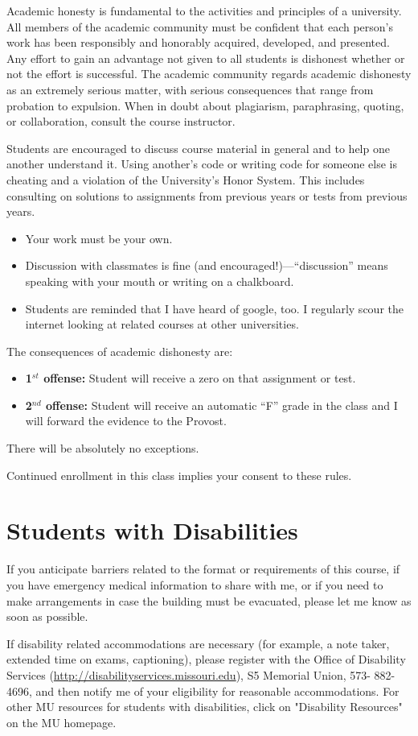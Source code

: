 \documentclass[11pt]{article}
\begin{document}
Academic honesty is fundamental to the activities and principles of a university. All members of the academic community must be confident that each person's work has been responsibly and honorably acquired, developed, and presented. Any effort to gain an advantage not given to all students is dishonest whether or not the effort is successful. The academic community regards academic dishonesty as an extremely serious matter, with serious consequences that range from probation to expulsion. When in doubt about plagiarism, paraphrasing, quoting, or collaboration, consult the course instructor. 
	
	Students are encouraged to discuss course material in general and to help one another understand it. Using another's code or writing code for someone else is cheating and a violation of the University's Honor System. This includes consulting on solutions to assignments from previous years or tests from previous years. 
\begin{itemize}
\item Your work must be your own. 
\item Discussion with classmates is fine (and encouraged!)---``discussion'' means speaking with your mouth or writing on a chalkboard.
\item Students are reminded that I have heard of google, too. I regularly scour the internet looking at related courses at other universities.
\end{itemize}

The consequences of academic dishonesty are:
\begin{itemize}
\item[] {\bf 1$^{st}$ offense:} Student will receive a zero on that assignment or test.
\item[] {\bf 2$^{nd}$ offense:} Student will receive an automatic “F” grade in the class and I will forward the evidence to the Provost.
\end{itemize}
There will be absolutely no exceptions.

Continued enrollment in this class implies your consent to these rules.


\section{Students with Disabilities}

If you anticipate barriers related to the format or requirements of this course, if you have emergency medical information to share with me, or if you need to make arrangements in case the building must be evacuated, please let me know as soon as possible.

If disability related accommodations are necessary (for example, a note taker, extended time on exams, captioning), please register with the Office of Disability Services (\url{http://disabilityservices.missouri.edu}), S5 Memorial Union, 573- 882-4696, and then notify me of your eligibility for reasonable accommodations.  For other MU resources for students with disabilities, click on "Disability Resources" on the MU homepage.
\end{document}
